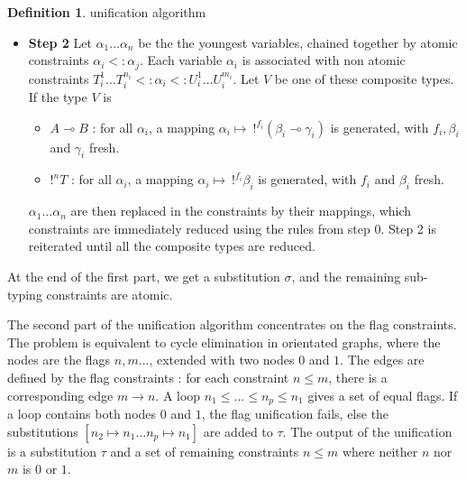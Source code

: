 \documentclass[10pt]{article}
\theoremstyle{plain}
\theoremstyle{definition}
\newtheorem{defn}{Definition}[subsection] %
\begin{document}
\begin{defn}{unification algorithm}
\begin{itemize}
  	\item{\bf Step 2} Let $\alpha_1 \dots \alpha_n$ be the the youngest variables, chained together by atomic constraints
  		$\alpha_i <: \alpha_j$. Each variable $\alpha_i$ is associated with non atomic constraints $T_i^1 \dots T_i^{n_i} <: \alpha_i
  		<: U_i^1 \dots U_i^{m_i}$. Let $V$ be one of these composite types.
  		If the type $V$ is
  		\begin{itemize}
  			\item $A \multimap B$ : for all $\alpha_i$, a mapping $\alpha_i \mapsto ~ !^{f_i} (\beta_i \multimap \gamma_i)$ is generated,
  				with $f_i, \beta_i$ and $\gamma_i$ fresh.
  			\item $!^n T$ : for all $\alpha_i$, a mapping $\alpha_i \mapsto ~ !^{f_i} \beta_i$ is generated,
  				with $f_i$ and $\beta_i$ fresh.
  		\end{itemize}
		  $\alpha_1 \dots \alpha_n$ are then replaced in the constraints by their mappings, which constraints are immediately reduced
		  using the rules from step 0. Step 2 is reiterated until all the composite types are reduced.  	
  \end{itemize}

	At the end of the first part, we get a substitution $\sigma$, and the remaining sub-typing constraints are atomic.
	
	The second part of the unification algorithm concentrates on the flag constraints.
	The problem is equivalent to cycle elimination in orientated graphs, where the nodes are the flags
	$n, m \dots$, extended with two nodes $0$ and $1$. The edges are defined by the flag constraints :
	for each constraint $n \le m$, there is a corresponding edge $m \rightarrow n$.
	A loop $n_1 \le \dots \le n_p \le n_1$ gives a set of equal flags. If a loop contains both nodes $0$ and $1$, the
	flag unification fails, else the substitutions $[n_2 \mapsto n_1 \dots n_p \mapsto n_1]$ are added to $\tau$.
	The output of the unification is a substitution $\tau$ and a set of remaining constraints $n \le m$ where neither
	$n$ nor $m$ is $0$ or $1$.

\end{defn}
\end{document}
